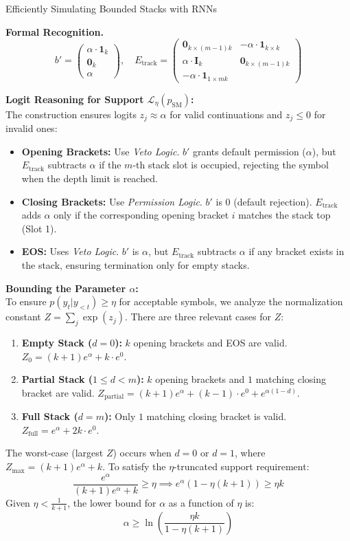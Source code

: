\begin{question}{Efficiently Simulating Bounded Stacks with RNNs}
\begin{subquestion}{\textbf{Formal Recognition.}}
\[
b' = \begin{pmatrix} \alpha \cdot \mathbf{1}_k \\ \mathbf{0}_k \\ \alpha \end{pmatrix}, \quad 
E_{\text{track}} = \begin{pmatrix} 
\mathbf{0}_{k \times (m-1)k} & -\alpha \cdot \mathbf{1}_{k \times k} \\
\alpha \cdot \mathbf{I}_k & \mathbf{0}_{k \times (m-1)k} \\
-\alpha \cdot \mathbf{1}_{1 \times mk}
\end{pmatrix}
\]

\textbf{Logit Reasoning for Support $\mathcal{L}_{\eta}(p_{\text{SM}})$:} \\
The construction ensures logits $z_j \approx \alpha$ for valid continuations and $z_j \le 0$ for invalid ones:
\begin{itemize}
    \item \textbf{Opening Brackets:} Use \textit{Veto Logic}. $b'$ grants default permission ($\alpha$), but $E_{\text{track}}$ subtracts $\alpha$ if the $m$-th stack slot is occupied, rejecting the symbol when the depth limit is reached.
    \item \textbf{Closing Brackets:} Use \textit{Permission Logic}. $b'$ is $0$ (default rejection). $E_{\text{track}}$ adds $\alpha$ only if the corresponding opening bracket $i$ matches the stack top (Slot 1).
    \item \textbf{EOS:} Uses \textit{Veto Logic}. $b'$ is $\alpha$, but $E_{\text{track}}$ subtracts $\alpha$ if any bracket exists in the stack, ensuring termination only for empty stacks.
\end{itemize}

\textbf{Bounding the Parameter $\alpha$:} \\
To ensure $p(y_t | y_{<t}) \ge \eta$ for acceptable symbols, we analyze the normalization constant $Z = \sum_{j} \exp(z_j)$. There are three relevant cases for $Z$:
\begin{enumerate}
    \item \textbf{Empty Stack ($d=0$):} $k$ opening brackets and EOS are valid. $Z_0 = (k+1)e^{\alpha} + k \cdot e^0$.
    \item \textbf{Partial Stack ($1 \le d < m$):} $k$ opening brackets and $1$ matching closing bracket are valid. $Z_{\text{partial}} = (k+1)e^{\alpha} + (k-1) \cdot e^0 + e^{\alpha(1-d)}$.
    \item \textbf{Full Stack ($d=m$):} Only $1$ matching closing bracket is valid. $Z_{\text{full}} = e^{\alpha} + 2k \cdot e^0$.
\end{enumerate}
The worst-case (largest $Z$) occurs when $d=0$ or $d=1$, where $Z_{\text{max}} = (k+1)e^{\alpha} + k$. To satisfy the $\eta$-truncated support requirement:
\[ \frac{e^{\alpha}}{(k+1)e^{\alpha} + k} \ge \eta \implies e^{\alpha}(1 - \eta(k+1)) \ge \eta k \]
Given $\eta < \frac{1}{k+1}$, the lower bound for $\alpha$ as a function of $\eta$ is:
\[ \alpha \ge \ln \left( \frac{\eta k}{1 - \eta(k+1)} \right) \]


\end{subquestion}
\end{question}
